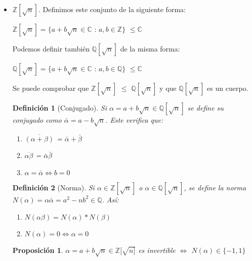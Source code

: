 \documentclass[11pt, a4paper, titlepage]{article}
\newif\IfInSansMode
\providecommand{\ent}{\mathbb{Z}}
\providecommand{\rac}{\mathbb{Q}}
\theoremstyle{theorem-style}
\newtheorem{nprop}{Proposición}[section]
\theoremstyle{definition-style}
\newtheorem{ndef}{Definición}[section]
\theoremstyle{remark-style}
\theoremstyle{example-style}
\begin{document}
\begin{itemize}
\item $\mathbb{Z}[\sqrt{n}]$.
Definimos este conjunto de la siguiente forma:
\begin{center}$\mathbb{Z}[\sqrt{n}] = \{a+b\sqrt{n} \in \mathbb{C}$ : $a,b \in \mathbb{Z} \}$ $\leq \mathbb{C}$\end{center}

Podemos definir también $\mathbb{Q}[\sqrt{n}]$ de la misma forma:

\begin{center}$\mathbb{Q}[\sqrt{n}] = \{a+b\sqrt{n} \in \mathbb{C}$ : $a,b \in \mathbb{Q} \}$ $\leq \mathbb{C}$\end{center}

Se puede comprobar que $\mathbb{Z}[\sqrt{n}]$ $\leq$ $\mathbb{Q}[\sqrt{n}]$ y que $\mathbb{Q}[\sqrt{n}]$ es un cuerpo.

\begin{ndef}[Conjugado]
	Si $\alpha = a+b\sqrt{n}\in \mathbb{Q}[\sqrt{n}]$ se define su conjugado como $\bar{\alpha} = a - b\sqrt{n}$. Este verifica que:
\begin{enumerate}

\item $ \overline{(\alpha+ \beta)} $ = $\bar{\alpha} + \bar{\beta}$
\item $\overline{\alpha \beta}$ = $\bar{\alpha}\bar{\beta}$
\item $\alpha = \bar{\alpha} \Leftrightarrow b = 0$

\end{enumerate}
\end{ndef}

\begin{ndef}[Norma]
	Si $\alpha \in \mathbb{Z}[\sqrt{n}]$ o $\alpha \in \mathbb{Q}[\sqrt{n}]$, se define la norma $N(\alpha) = \alpha \bar{\alpha} = a^2 - nb^2 \in \rac $. Así:
\begin{enumerate}
	\item $N(\alpha \beta) = N(\alpha) * N(\beta)$
	\item $N(\alpha) = 0 \iff \alpha = 0$
\end{enumerate}
\end{ndef}


\begin{nprop}
	$\alpha = a + b \sqrt{n} \in \ent[\sqrt{n]}$ es invertible $\iff$ $N(\alpha) \in \{-1,1\}$
\end{nprop}

\end{itemize}
\end{document}
